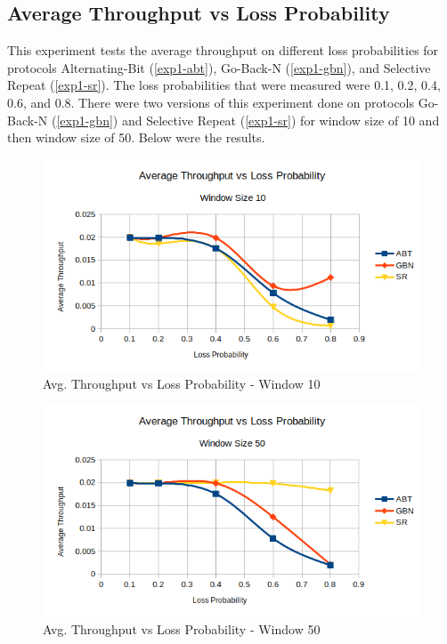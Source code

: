 \documentclass[10pt, a4paper]{article}
\begin{document}
  \subsection{Average Throughput vs Loss Probability}
    This experiment tests the average throughput on different loss probabilities for protocols Alternating-Bit (\ref{exp1-abt}), Go-Back-N (\ref{exp1-gbn}), and Selective Repeat (\ref{exp1-sr}). The loss probabilities that were measured were 0.1, 0.2, 0.4, 0.6, and 0.8. There were two versions of this experiment done on protocols Go-Back-N (\ref{exp1-gbn}) and Selective Repeat (\ref{exp1-sr}) for window size of 10 and then window size of 50.  Below were the results. 
    
    \begin{figure}[H]
        \includegraphics[width=\textwidth]{exp1-w10.png}
        \centering
        \caption{Avg. Throughput vs Loss Probability -  Window 10 }
        \label{fig:exp1-w10}
    \end{figure}
    
    \begin{figure}[H]
        \includegraphics[width=\textwidth]{exp1-w50.png}
        \centering
        \caption{Avg. Throughput vs Loss Probability - Window 50 }
        \label{fig:exp1-w50}
    \end{figure}
    
\end{document}
